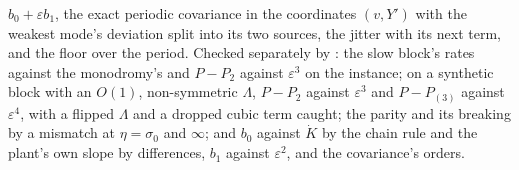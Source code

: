 {$b_0 + \varepsilon b_1$, the exact periodic covariance in the coordinates $(v,Y')$ with the weakest mode's deviation
split into its two sources, the jitter with its next term, and the floor over the period. Checked separately by
: the slow block's rates against the monodromy's and $P - P_2$ against
$\varepsilon^3$ on the instance; on a synthetic block with an $O(1)$, non-symmetric $\Lambda$, $P - P_2$ against
$\varepsilon^3$ and $P - P_{(3)}$ against $\varepsilon^4$, with a flipped $\Lambda$ and a dropped cubic term caught;
the parity and its breaking by a mismatch at $\eta = \sigma_0$ and $\infty$; and $b_0$ against $\dot K$ by the chain
rule and the plant's own slope by differences, $b_1$ against $\varepsilon^2$, and the covariance's orders.}

